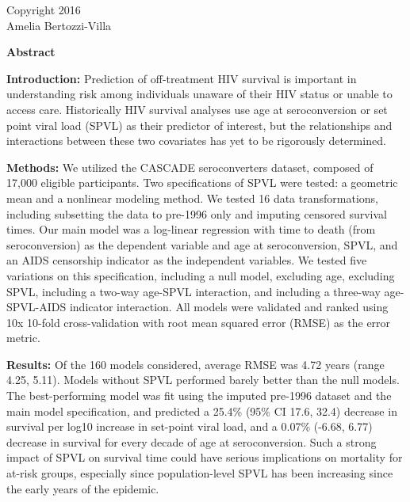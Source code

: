 \documentclass[12pt, titlepage, proquest]{article}
\begin{document}



    \vspace{7pc}
    \begin{center}
      \textcopyright Copyright 2016 \\
      Amelia Bertozzi-Villa
    \end{center}

\newpage

\textbf{Abstract}

\textbf{Introduction:} Prediction of off-treatment HIV survival is important in understanding risk among individuals unaware of their HIV status or unable to access care. Historically HIV survival analyses use age at seroconversion or set point viral load (SPVL) as their predictor of interest, but the relationships and interactions between these two covariates has yet to be rigorously determined.

\textbf{Methods:} We utilized the CASCADE seroconverters dataset, composed of 17,000 eligible participants. Two specifications of SPVL were tested: a geometric mean and a nonlinear modeling method. We tested 16 data transformations, including subsetting the data to pre-1996 only and imputing censored survival times. Our main model was a log-linear regression with time to death (from seroconversion) as the dependent variable and age at seroconversion, SPVL, and an AIDS censorship indicator as the independent variables. We tested five variations on this specification, including a null model, excluding age, excluding SPVL, including a two-way age-SPVL interaction, and including a three-way age-SPVL-AIDS indicator interaction. All models were validated and ranked using 10x 10-fold cross-validation with root mean squared error (RMSE) as the error metric. 

\textbf{Results:} Of the 160 models considered, average RMSE was 4.72 years (range 4.25, 5.11). Models without SPVL performed barely better than the null models. The best-performing model was fit using the imputed pre-1996 dataset and the main model specification, and predicted a 25.4\% (95\% CI 17.6, 32.4) decrease in survival per log10 increase in set-point viral load, and a 0.07\% (-6.68, 6.77) decrease in survival for every decade of age at seroconversion. Such a strong impact of SPVL on survival time could have serious implications on mortality for at-risk groups, especially since population-level SPVL has been increasing since the early years of the epidemic.
\end{document}
